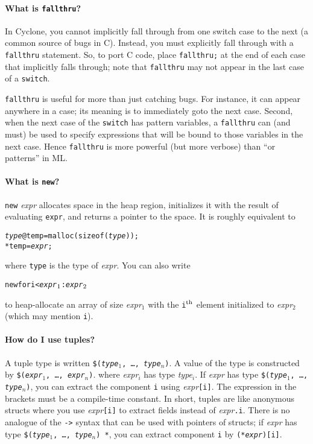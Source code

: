 \paragraph{What is \texttt{fallthru}?}

In Cyclone, you cannot implicitly fall through from one switch case to
the next (a common source of bugs in C).  Instead, you must explicitly
fall through with a \texttt{fallthru} statement.  So, to port C code,
place \texttt{fallthru;} at the end of each case that implicitly falls
through; note that \texttt{fallthru} may not appear in the last case
of a \texttt{switch}.

\texttt{fallthru} is useful for more than just catching bugs.  For
instance, it can appear anywhere in a case; its meaning is to
immediately goto the next case.  Second, when the next case of the
\texttt{switch} has pattern variables, a \texttt{fallthru} can (and
must) be used to specify expressions that will be bound to those
variables in the next case.  Hence \texttt{fallthru} is more powerful
(but more verbose) than ``or patterns'' in ML\@.

\paragraph{What is \texttt{new}?}

\texttt{new} \textit{expr} allocates space in the heap region,
initializes it with the result of evaluating \texttt{expr}, and
returns a pointer to the space.  It is roughly equivalent to
\begin{alltt}
 \textit{type} @temp = malloc(sizeof(\textit{type}));
 *temp = \textit{expr};
\end{alltt}
where \texttt{type} is the type of \textit{expr}.  You can also write
\begin{alltt}
  new \lb for i < \textit{expr}\(\sb{1}\) : \textit{expr}\(\sb{2}\) \rb
\end{alltt}
to heap-allocate an array of size \textit{expr}$_1$ with the
\texttt{i}$^{\rm th}$ element initialized to \textit{expr}$_2$ (which
may mention \texttt{i}).

\paragraph{How do I use tuples?}

A tuple type is written
\texttt{\$(\textit{type}$_1$, \ldots, \textit{type}$_n$)}.
A value of the type is constructed by
\texttt{\$(\textit{expr}$_1$, \ldots, \textit{expr}$_n$)}.
where \textit{expr}$_i$ has type \textit{type}$_i$.  
If \textit{expr} has type
\texttt{\$(\textit{type}$_1$, \ldots, \textit{type}$_n$)},
you can extract the component \texttt{i} using
\textit{expr}\texttt{[i]}.
The expression in the brackets must be a compile-time constant.  In
short, tuples are like anonymous structs where you use
\textit{expr}\texttt{[i]} to extract fields instead of
\textit{expr}\texttt{.i}.
There is no analogue of the \texttt{->} syntax that can be used with
pointers of structs; if 
\textit{expr} has type
\texttt{\$(\textit{type}$_1$, \ldots, \textit{type}$_n$) *},
you can extract component \texttt{i} by \texttt{(*\textit{expr})[i]}.

